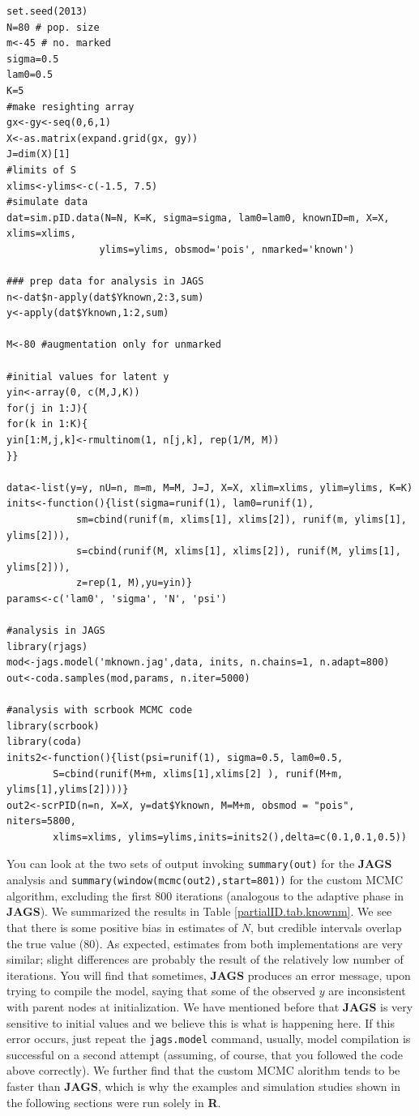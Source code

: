 {\small
\begin{verbatim}
set.seed(2013)
N=80 # pop. size
m<-45 # no. marked
sigma=0.5
lam0=0.5
K=5
#make resighting array
gx<-gy<-seq(0,6,1)
X<-as.matrix(expand.grid(gx, gy))
J=dim(X)[1]
#limits of S
xlims<-ylims<-c(-1.5, 7.5)
#simulate data
dat=sim.pID.data(N=N, K=K, sigma=sigma, lam0=lam0, knownID=m, X=X, xlims=xlims,
				ylims=ylims, obsmod='pois',	nmarked='known')

### prep data for analysis in JAGS
n<-dat$n-apply(dat$Yknown,2:3,sum)
y<-apply(dat$Yknown,1:2,sum)

M<-80 #augmentation only for unmarked

#initial values for latent y
yin<-array(0, c(M,J,K))
for(j in 1:J){
for(k in 1:K){
yin[1:M,j,k]<-rmultinom(1, n[j,k], rep(1/M, M))
}}

data<-list(y=y, nU=n, m=m, M=M, J=J, X=X, xlim=xlims, ylim=ylims, K=K)
inits<-function(){list(sigma=runif(1), lam0=runif(1),
			sm=cbind(runif(m, xlims[1], xlims[2]), runif(m, ylims[1], ylims[2])),
			s=cbind(runif(M, xlims[1], xlims[2]), runif(M, ylims[1], ylims[2])),
			z=rep(1, M),yu=yin)}
params<-c('lam0', 'sigma', 'N', 'psi')

#analysis in JAGS
library(rjags)
mod<-jags.model('mknown.jag',data, inits, n.chains=1, n.adapt=800)
out<-coda.samples(mod,params, n.iter=5000)

#analysis with scrbook MCMC code
library(scrbook)
library(coda)
inits2<-function(){list(psi=runif(1), sigma=0.5, lam0=0.5,
		S=cbind(runif(M+m, xlims[1],xlims[2] ), runif(M+m, ylims[1],ylims[2])))}
out2<-scrPID(n=n, X=X, y=dat$Yknown, M=M+m, obsmod = "pois", niters=5800,
		xlims=xlims, ylims=ylims,inits=inits2(),delta=c(0.1,0.1,0.5))
\end{verbatim}
}
You can look at the two sets of output invoking {\tt summary(out)} for the {\bf JAGS} analysis and {\tt summary(window(mcmc(out2),start=801))} for the custom MCMC algorithm, excluding the first 800 iterations (analogous to the adaptive phase in {\bf JAGS}). We summarized the results in Table \ref{partialID.tab.knownm}. We see that there is some positive bias in estimates of $N$, but credible intervals overlap the true value (80). As expected, estimates from both implementations are very similar; slight differences are probably the result of the relatively low number of iterations.
You will find that sometimes, {\bf JAGS} produces an error message, upon trying to compile the model, saying that some of the observed $y$ are inconsistent with parent nodes at initialization. We have mentioned before that  {\bf JAGS} is very sensitive to initial values and we believe this is what is happening here. If this error occurs, just repeat the {\tt jags.model} command, usually, model compilation is successful on a second attempt (assuming, of course, that you followed the code above correctly). We further find that the custom MCMC alorithm tends to be faster than {\bf JAGS}, which is why the examples and simulation studies shown in the following sections were run solely in {\bf R}.

